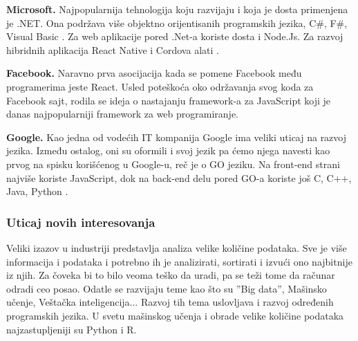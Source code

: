 \documentclass[a4paper]{article}
\begin{document}
\textbf{Microsoft.} Najpopularnija tehnologija koju razvijaju i koja je dosta primenjena je .NET. Ona podržava više objektno orijentisanih programskih jezika, C\#, F\#, Visual Basic \cite{dotnet}. Za web aplikacije pored .Net-a koriste dosta i Node.Js. Za razvoj hibridnih aplikacija React Native i Cordova alati \cite{webPlatforms}.

\textbf{Facebook.} Naravno prva asocijacija kada se pomene Facebook među programerima jeste React. Usled poteškoća oko održavanja svog koda za Facebook sajt, rodila se ideja o nastajanju framework-a za JavaScript koji je danas najpopularniji framework za web programiranje.

\textbf{Google.} Kao jedna od vodećih IT kompanija Google ima veliki uticaj na razvoj jezika. Između ostalog, oni su oformili i svoj jezik pa ćemo njega navesti kao prvog na spisku korišćenog u Google-u, reč je o GO jeziku. Na front-end strani najviše koriste JavaScript, dok na back-end delu pored GO-a koriste još C, C++, Java, Python \cite{google}.

\subsubsection{Uticaj novih interesovanja}
\label{subsec:Uticaj novih interesovanja}
Veliki izazov u industriji predstavlja analiza velike količine podataka. Sve je više informacija i podataka i potrebno ih je analizirati, sortirati i izvući ono najbitnije iz njih. Za čoveka bi to bilo veoma teško da uradi, pa se teži tome da računar odradi ceo posao. Odatle se razvijaju teme kao što su ''Big data'', Mašinsko učenje, Veštačka inteligencija... Razvoj tih tema uslovljava i razvoj određenih programskih jezika. U svetu mašinskog učenja i obrade velike količine podataka najzastupljeniji su Python i R.
\end{document}
